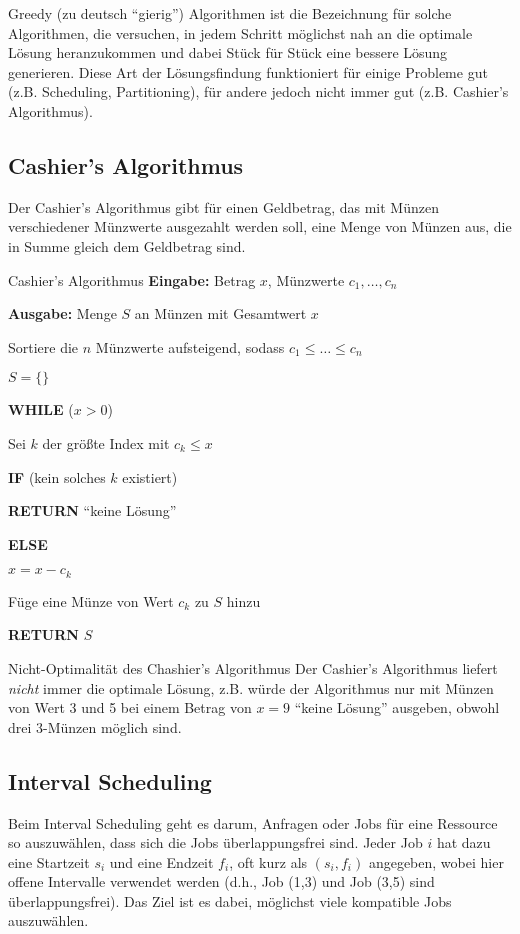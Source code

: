 \documentclass{panikzettel}
\newcommand\tab[1][1cm]{\hspace*{#1}}
\begin{document}
Greedy (zu deutsch ``gierig'') Algorithmen ist die Bezeichnung für solche Algorithmen, die versuchen, in jedem Schritt möglichst nah an die optimale Lösung heranzukommen und dabei Stück für Stück eine bessere Lösung generieren. Diese Art der Lösungsfindung funktioniert für einige Probleme gut (z.B. Scheduling, Partitioning), für andere jedoch nicht immer gut (z.B. Cashier's Algorithmus).

\subsection{Cashier's Algorithmus}

Der Cashier's Algorithmus gibt für einen Geldbetrag, das mit Münzen verschiedener Münzwerte ausgezahlt werden soll, eine Menge von Münzen aus, die in Summe gleich dem Geldbetrag sind. 

\begin{algo}{Cashier's Algorithmus}
	\textbf{Eingabe:} Betrag $x$, Münzwerte $c_1, \dots , c_n$
	
	\textbf{Ausgabe:} Menge $S$ an Münzen mit Gesamtwert $x$
	\tcblower
	
	Sortiere die $n$ Münzwerte aufsteigend, sodass $c_1 \leq \dots \leq c_n$
	
	$S = \{ \}$
	
	\textbf{WHILE} ($x>0$)
	
	\tab Sei $k$ der größte Index mit $c_k \leq x$
	
	\tab \textbf{IF} (kein solches $k$ existiert)
	
	\tab\tab \textbf{RETURN} ``keine Lösung''
	
	\tab \textbf{ELSE} 
	
	\tab\tab $x = x - c_k$
		
	\tab\tab Füge eine Münze von Wert $c_k$ zu $S$ hinzu
	
	\tab \textbf{RETURN} $S$
\end{algo}

\begin{theo}{Nicht-Optimalität des Chashier's Algorithmus} Der Cashier's Algorithmus liefert \textit{nicht} immer die optimale Lösung, z.B. würde der Algorithmus nur mit Münzen von Wert 3 und 5 bei einem Betrag von $x=9$ ``keine Lösung'' ausgeben, obwohl drei 3-Münzen möglich sind. 

\end{theo}

\subsection{Interval Scheduling}
Beim Interval Scheduling geht es darum, Anfragen oder Jobs für eine Ressource so auszuwählen, dass sich die Jobs überlappungsfrei sind. Jeder Job $i$ hat dazu eine Startzeit $s_i$ und eine Endzeit $f_i$, oft kurz als $(s_i,f_i)$ angegeben, wobei hier offene Intervalle verwendet werden (d.h., Job (1,3) und Job (3,5) sind überlappungsfrei). Das Ziel ist es dabei, möglichst viele kompatible Jobs auszuwählen. 
\end{document}

